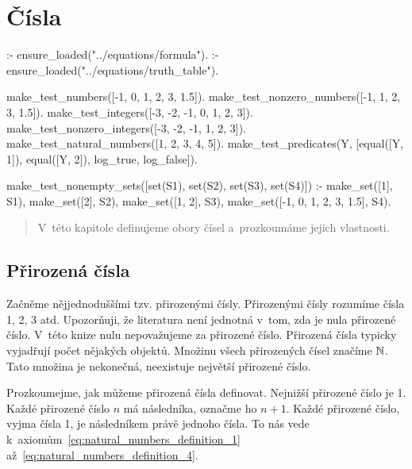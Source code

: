 \chapter{Čísla}

\begin{prolog}
:- ensure_loaded("../equations/formula").
:- ensure_loaded("../equations/truth_table").

make_test_numbers([-1, 0, 1, 2, 3, 1.5]).
make_test_nonzero_numbers([-1, 1, 2, 3, 1.5]).
make_test_integers([-3, -2, -1, 0, 1, 2, 3]).
make_test_nonzero_integers([-3, -2, -1, 1, 2, 3]).
make_test_natural_numbers([1, 2, 3, 4, 5]).
make_test_predicates(Y, [equal([Y, 1]), equal([Y, 2]), log_true, log_false]).

make_test_nonempty_sets([set(S1), set(S2), set(S3), set(S4)]) :-
	make_set([1], S1),
	make_set([2], S2),
	make_set([1, 2], S3),
	make_set([-1, 0, 1, 2, 3, 1.5], S4).
	
\end{prolog}


\begin{abstract}
V~této kapitole definujeme obory čísel a~prozkoumáme jejich vlastnosti.
\end{abstract}

\section{Přirozená čísla}

Začněme nějjednoduššími tzv. přirozenými čísly. Přirozenými čísly rozumíme čísla 1, 2, 3 atd. Upozorňuji, že literatura není jednotná v~tom, zda je nula přirozené číslo. V~této knize nulu nepovažujeme za přirozené číslo. Přirozená čísla typicky vyjadřují počet nějakých objektů. Množinu všech přirozených čísel značíme \(\mathbb{N}\). Tato množina je nekonečná, neexistuje největší přirozené číslo.

Prozkoumejme, jak můžeme přirozená čísla definovat. Nejnižší přirozené číslo je 1. Každé přirozené číslo \(n\) má
následníka, označme ho \(n + 1\). Každé přirozené číslo, vyjma čísla 1, je následníkem právě jednoho čísla. To nás vede k~axiomům~\eqref{eq:natural_numbers_definition_1} až~\eqref{eq:natural_numbers_definition_4}.

